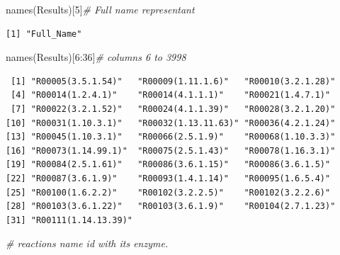 \documentclass[
  letterpaper,
  DIV=11,
  numbers=noendperiod]{scrreprt}
\newenvironment{Shaded}{}{}
\newcommand{\CommentTok}[1]{\textcolor[rgb]{0.36,0.39,0.44}{\textit{#1}}}
\newcommand{\DecValTok}[1]{\textcolor[rgb]{0.82,0.60,0.40}{#1}}
\newcommand{\FunctionTok}[1]{\textcolor[rgb]{0.38,0.69,0.94}{#1}}
\newcommand{\NormalTok}[1]{\textcolor[rgb]{0.67,0.70,0.75}{#1}}
\newcommand{\OtherTok}[1]{\textcolor[rgb]{0.15,0.68,0.38}{#1}}
\newcommand{\SpecialCharTok}[1]{\textcolor[rgb]{0.34,0.71,0.76}{#1}}
\newcommand{\StringTok}[1]{\textcolor[rgb]{0.60,0.76,0.47}{#1}}
\begin{document}
\begin{Shaded}
\begin{Highlighting}[]
\FunctionTok{names}\NormalTok{(Results)[}\DecValTok{5}\NormalTok{]}\CommentTok{\# Full name representant}
\end{Highlighting}
\end{Shaded}

\begin{verbatim}
[1] "Full_Name"
\end{verbatim}

\begin{Shaded}
\begin{Highlighting}[]
\FunctionTok{names}\NormalTok{(Results)[}\DecValTok{6}\SpecialCharTok{:}\DecValTok{36}\NormalTok{]}\CommentTok{\# columns 6 to 3998 }
\end{Highlighting}
\end{Shaded}

\begin{verbatim}
 [1] "R00005(3.5.1.54)"   "R00009(1.11.1.6)"   "R00010(3.2.1.28)"  
 [4] "R00014(1.2.4.1)"    "R00014(4.1.1.1)"    "R00021(1.4.7.1)"   
 [7] "R00022(3.2.1.52)"   "R00024(4.1.1.39)"   "R00028(3.2.1.20)"  
[10] "R00031(1.10.3.1)"   "R00032(1.13.11.63)" "R00036(4.2.1.24)"  
[13] "R00045(1.10.3.1)"   "R00066(2.5.1.9)"    "R00068(1.10.3.3)"  
[16] "R00073(1.14.99.1)"  "R00075(2.5.1.43)"   "R00078(1.16.3.1)"  
[19] "R00084(2.5.1.61)"   "R00086(3.6.1.15)"   "R00086(3.6.1.5)"   
[22] "R00087(3.6.1.9)"    "R00093(1.4.1.14)"   "R00095(1.6.5.4)"   
[25] "R00100(1.6.2.2)"    "R00102(3.2.2.5)"    "R00102(3.2.2.6)"   
[28] "R00103(3.6.1.22)"   "R00103(3.6.1.9)"    "R00104(2.7.1.23)"  
[31] "R00111(1.14.13.39)"
\end{verbatim}

\begin{Shaded}
\begin{Highlighting}[]
\CommentTok{\# reactions name id with its enzyme.}
\end{Highlighting}
\end{Shaded}

\begin{Shaded}
\end{Shaded}
\end{document}
